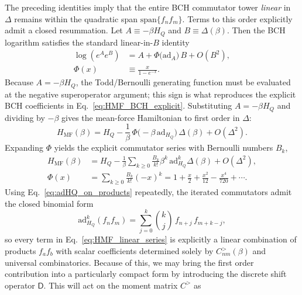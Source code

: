 The preceding identities imply that the entire BCH commutator tower \emph{linear} in $\Delta$ remains within the quadratic span $\mathrm{span}\{f_nf_m\}$. Terms to this order explicitly admit a closed resummation. Let $A\equiv-\beta H_Q$ and $B\equiv \Delta(\beta)$. Then the BCH logarithm satisfies the standard
linear-in-$B$ identity~\cite{wilcoxExponentialOperatorsParameter1967a,weiLieAlgebraicSolution1963}
\begin{equation}
    \label{eq:BCH_linear_resum}
    \begin{split}
        \log\!\left(e^{A}e^{B}\right) & = A+\Phi\!\big(\mathrm{ad}_{A}\big)\,B+O(B^2), \\
        \Phi(x)                       & \equiv \frac{x}{1-e^{-x}}.
    \end{split}
\end{equation}
Because $A=-\beta H_Q$, the Todd/Bernoulli generating function must be
evaluated at the negative superoperator argument; this sign is what reproduces
the explicit BCH coefficients in Eq.~\eqref{eq:HMF_BCH_explicit}. Substituting
$A=-\beta H_Q$ and dividing by $-\beta$ gives the mean-force Hamiltonian to
first order in $\Delta$:
\begin{equation}
    \label{eq:HMF_linear_resum}
    H_{\mathrm{MF}}(\beta) = H_Q - \frac{1}{\beta}\,\Phi\!\big(-\beta\,\mathrm{ad}_{H_Q}\big)\,\Delta(\beta)+O(\Delta^2).
\end{equation}
Expanding $\Phi$ yields the explicit commutator series with Bernoulli numbers $B_k$,
\begin{equation}
    \label{eq:HMF_linear_series}
    \begin{split}
        H_{\mathrm{MF}}(\beta) & = H_Q - \frac{1}{\beta}\sum_{k\ge 0}\frac{B_k}{k!}\beta^k\,\mathrm{ad}_{H_Q}^k\Delta(\beta) + O(\Delta^2), \\
        \Phi(x)                & = \sum_{k\ge 0}\frac{B_k}{k!}(-x)^k
        = 1+\frac{x}{2}+\frac{x^2}{12}-\frac{x^4}{720}+\cdots .
    \end{split}
\end{equation}
Using Eq.~\eqref{eq:adHQ_on_products} repeatedly, the iterated commutators admit the closed binomial form
\begin{equation}
    \label{eq:adHQk_on_products}
    \mathrm{ad}_{H_Q}^{k}(f_n f_m)
    =\sum_{j=0}^{k}\binom{k}{j}\, f_{n+j}\, f_{m+k-j},
\end{equation}
so every term in Eq.~\eqref{eq:HMF_linear_series} is explicitly a linear combination of products $f_af_b$
with scalar coefficients determined solely by $C^{>}_{nm}(\beta)$ and universal combinatorics. Because of this, we may bring the first order contribution into a particularly compact form by introducing the discrete shift operator $\mathsf D$. This will act on the moment matrix $C^{>}$ as
